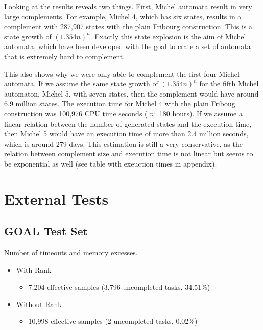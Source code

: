 Looking at the results reveals two things. First, Michel automata result in very large complements. For example, Michel 4, which has six states, results in a complement with 287,907 states with the plain Fribourg construction. This is a state growth of $(1.354n)^n$. Exactly this state explosion is the aim of Michel automata, which have been developed with the goal to crate a set of automata that is extremely hard to complement.

This also shows why we were only able to complement the first four Michel automata. If we assume the same state growth of $(1.354n)^n$ for the fifth Michel automaton, Michel 5, with seven states, then the complement would have around 6.9 million states. The execution time for Michel 4 with the plain Friboug construction was 100,976 CPU time seconds ($\approx$ 180 hours). If we assume a linear relation between the number of generated states and the execution time, then Michel 5 would have an execution time of more than 2.4 million seconds, which is around 279 days. This estimation is still a very conservative, as the relation between complement size and execution time is not linear but seems to be exponential as well (see table with exeuction times in appendix). 




\section{External Tests}
\label{ext}

\subsection{GOAL Test Set}

\begin{table}[ht]
\centering

\caption{Number of timeouts and memory excesses.}
\end{table}

\begin{itemize}
\item With Rank
  \begin{itemize}
  \item 7,204 effective samples (3,796 uncompleted tasks, 34.51\%)
  \end{itemize}
\item Without Rank
  \begin{itemize}
  \item 10,998 effective samples (2 uncompleted tasks, 0.02\%)
  \end{itemize}
\end{itemize}


